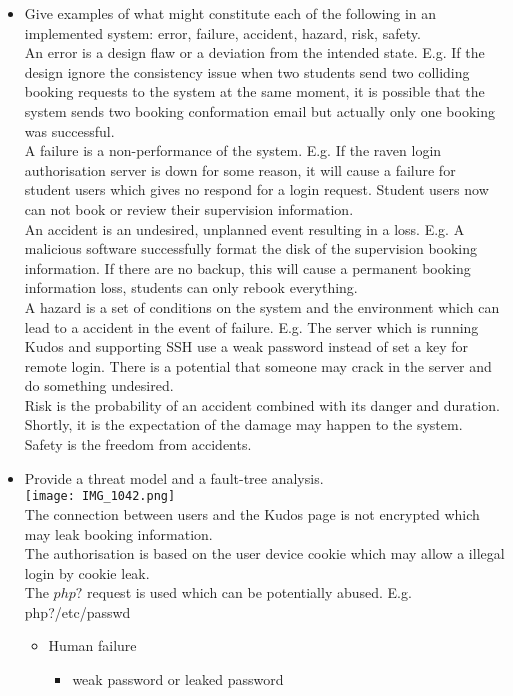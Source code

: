 \documentclass[10pt,twoside,a4paper]{article}
\begin{document}
\begin{itemize}
\item
Give examples of what might constitute each of the following in an implemented system: error, failure, accident, hazard, risk, safety. 
\\An error is a design flaw or a deviation from the intended state. E.g. If the design ignore the consistency issue when two students send two colliding booking requests to the system at the same moment, it is possible that the system sends two booking conformation email but actually only one booking was successful.
\\A failure is a non-performance of the system. E.g. If the raven login authorisation server is down for some reason, it will cause a failure for student users which gives no respond for a login request. Student users now can not book or review their supervision information.
\\An accident is an undesired, unplanned event resulting in a loss. E.g. A malicious software successfully format the disk of the supervision booking information. If there are no backup, this will cause a permanent booking information loss, students can only rebook everything.
\\A hazard is a set of conditions on the system and the environment which can lead to a accident in the event of failure. E.g. The server which is running Kudos and supporting SSH use a weak password instead of set a key for remote login. There is a potential that someone may crack in the server and do something undesired.
\\Risk is the probability of an accident combined with its danger and duration. Shortly, it is the expectation of the damage may happen to the system.
\\Safety is the freedom from accidents.
\item
Provide a threat model and a fault-tree analysis. 
\\\texttt{[image: IMG\_1042.png]} 
\\The connection between users and the Kudos page is not encrypted which may leak booking information.
\\The authorisation is based on the user device cookie which may allow a illegal login by cookie leak.
\\The $php?$ request is used which can be potentially abused. E.g. php?/etc/passwd
\begin{itemize}
\item Human failure
\begin{itemize}
\item weak password or leaked password

\end{itemize}
\end{itemize}
\end{itemize}
\end{document}
